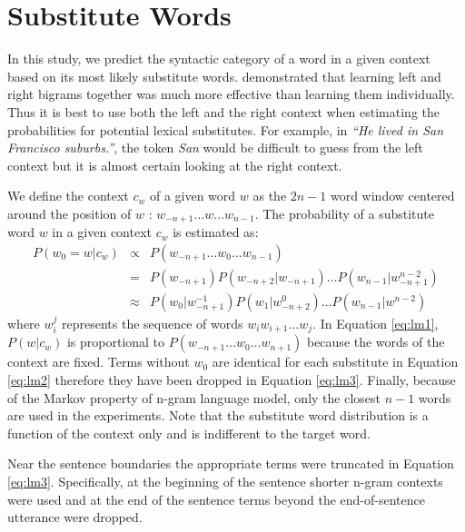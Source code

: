 \section{Substitute Words}
\label{sec:substitute_vectors}

In this study, we predict the syntactic category of a word in a given
context based on its most likely substitute words.  \cite{clair2010}
demonstrated that learning left and right bigrams together was much more
effective than learning them individually.  Thus it is best to use both the
left and the right context when estimating the probabilities for potential
lexical substitutes.  For example, in \emph{``He lived in San Francisco
suburbs.''}, the token \emph{San} would be difficult to guess from the left
context but it is almost certain looking at the right context.  

We define the context $c_w$ of a given word $w$ as the $2n-1$ word window
centered around the position of $w$ : $w_{-n+1} \ldots w \ldots w_{n-1}$.  The
probability of a substitute word $w$ in a given context $c_w$ is estimated
as: 
\begin{eqnarray} 
  \label{eq:lm1}
  P(w_0 = w | c_w) & \propto & P(w_{-n+1}\ldots w_0\ldots w_{n-1})\\
  \label{eq:lm2}& = & P(w_{-n+1})P(w_{-n+2}|w_{-n+1})\ldots P(w_{n-1}|w_{-n+1}^{n-2})\\
  \label{eq:lm3}& \approx & P(w_0| w_{-n+1}^{-1})P(w_{1}|w_{-n+2}^0)\ldots P(w_{n-1}|w^{n-2}) 
\end{eqnarray} 
where $w_i^j$ represents the sequence of words $w_i w_{i+1} \ldots w_{j}$.  In
Equation \ref{eq:lm1}, $P(w|c_w)$ is proportional to $P(w_{-n+1}\ldots w_0
\ldots w_{n+1})$ because the words of the context are fixed.  Terms without
$w_0$ are identical for each substitute in Equation \ref{eq:lm2} therefore they
have been dropped in Equation \ref{eq:lm3}.  Finally, because of the Markov
property of n-gram language model, only the closest $n-1$ words are used in the
experiments.  Note that the substitute word distribution is a function of the
context only and is indifferent to the target word.

Near the sentence boundaries the appropriate terms were truncated in
Equation \ref{eq:lm3}.  Specifically, at the beginning of the sentence
shorter n-gram contexts were used and at the end of the sentence terms
beyond the end-of-sentence utterance were dropped.  

